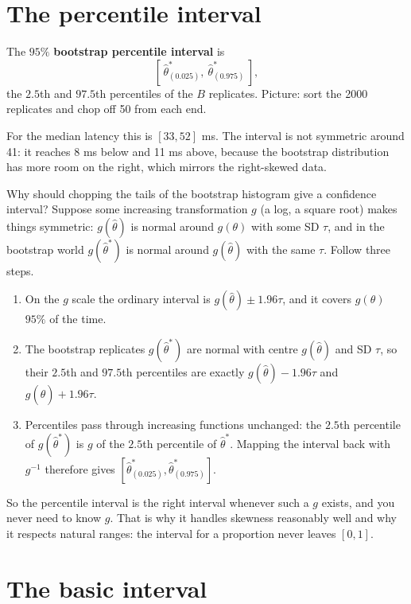 \section{The percentile interval}
\label{sec:boot-percentile}

\begin{definition}
The $95\%$ \textbf{bootstrap percentile interval} is
\[
  \left[\, \hat\theta^*_{(0.025)},\ \hat\theta^*_{(0.975)} \,\right],
\]
the $2.5$th and $97.5$th percentiles of the $B$ replicates. Picture: sort the
2000 replicates and chop off 50 from each end.
\end{definition}

For the median latency this is $[33, 52]$ ms. The interval is not symmetric
around 41: it reaches 8 ms below and 11 ms above, because the bootstrap
distribution has more room on the right, which mirrors the right-skewed data.

\begin{whybox}
Why should chopping the tails of the bootstrap histogram give a confidence
interval? Suppose some increasing transformation $g$ (a log, a square root)
makes things symmetric: $g(\hat\theta)$ is normal around $g(\theta)$ with some
SD $\tau$, and in the bootstrap world $g(\hat\theta^*)$ is normal around
$g(\hat\theta)$ with the same $\tau$. Follow three steps.
\begin{enumerate}
  \item On the $g$ scale the ordinary interval is
  $g(\hat\theta) \pm 1.96\tau$, and it covers $g(\theta)$ $95\%$ of the time.
  \item The bootstrap replicates $g(\hat\theta^*)$ are normal with centre
  $g(\hat\theta)$ and SD $\tau$, so their $2.5$th and $97.5$th percentiles are
  exactly $g(\hat\theta) - 1.96\tau$ and $g(\hat\theta) + 1.96\tau$.
  \item Percentiles pass through increasing functions unchanged: the
  $2.5$th percentile of $g(\hat\theta^*)$ is $g$ of the $2.5$th percentile of
  $\hat\theta^*$. Mapping the interval back with $g^{-1}$ therefore gives
  $[\hat\theta^*_{(0.025)}, \hat\theta^*_{(0.975)}]$.
\end{enumerate}
So the percentile interval is the right interval whenever such a $g$ exists,
and you never need to know $g$. That is why it handles skewness reasonably
well and why it respects natural ranges: the interval for a proportion never
leaves $[0,1]$.
\end{whybox}

\section{The basic interval}
\label{sec:boot-basic}

